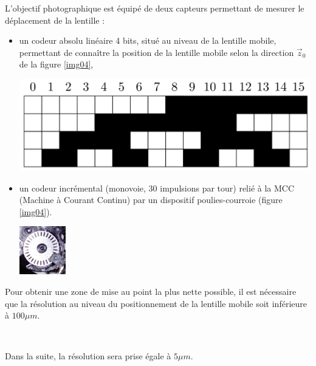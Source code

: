 L'objectif photographique est équipé de deux capteurs permettant de mesurer le déplacement de la lentille :
\begin{itemize}
 \item un codeur absolu linéaire 4 bits, situé au niveau de la lentille mobile, permettant de connaître la position de la lentille mobile selon la direction $\vec{z}_0$ de la figure \ref{img04},
\begin{center}
\includegraphics[width=0.6\linewidth]{img/image_01}
\end{center} 
 \item un codeur incrémental (monovoie, 30 impulsions par tour) relié à la MCC (Machine à Courant Continu) par un dispositif poulies-courroie (figure \ref{img04}).
 \begin{center}
\includegraphics[width=0.2\linewidth]{img/image_02}
\end{center} 
\end{itemize}

Pour obtenir une zone de mise au point la plus nette possible, il est nécessaire que la résolution au niveau du positionnement de la lentille mobile soit inférieure à $100 \mu m$.



~\

Dans la suite, la résolution sera prise égale à $5 \mu m$.

